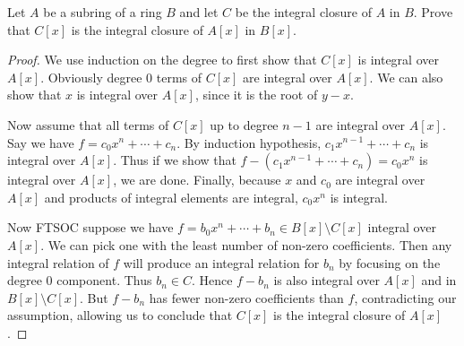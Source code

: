 \begin{exercise}
	Let $A$ be a subring of a ring $B$ and let $C$ be the integral closure of $A$ in $B$. Prove that $C[x]$ is the integral closure of $A[x]$ in $B[x]$.
\end{exercise}
\begin{proof}
	We use induction on the degree to first show that $C[x] $ is integral over $A[x] $.
	Obviously degree 0 terms of $C[x] $ are integral over $A[x] $.
	We can also show that $x $ is integral over $A[x] $, since it is the root of $y - x $.

	Now assume that all terms of $C[x] $ up to degree $n-1 $ are integral over $A[x] $.
	Say we have $f = c_{0}x^n + \cdots + c_n $.
	By induction hypothesis, $c_{1}x^{n-1} + \cdots + c_n $ is integral over $A[x] $.
	Thus if we show that $f - (c_{1}x^{n-1} + \cdots + c_n) = c_{0}x^n $ is integral over $A[x]$, we are done.
	Finally, because $x $ and $c_{0} $ are integral over $A[x] $ and products of integral elements are integral, $c_{0}x^n $ is integral.

	Now FTSOC suppose we have $f = b_{0}x^n + \cdots + b_n \in B[x] \setminus C[x]$ integral over $A[x] $.
	We can pick one with the least number of non-zero coefficients.
	Then any integral relation of $f $ will produce an integral relation for $b_n $ by focusing on the degree 0 component.
	Thus $b_n \in C $.
	Hence $f-b_n $ is also integral over $A[x] $ and in $B[x] \setminus C[x] $.
	But $f-b_n $ has fewer non-zero coefficients than $f $, contradicting our assumption, allowing us to conclude that $C[x] $ is the integral closure of $A[x] $.
\end{proof}

